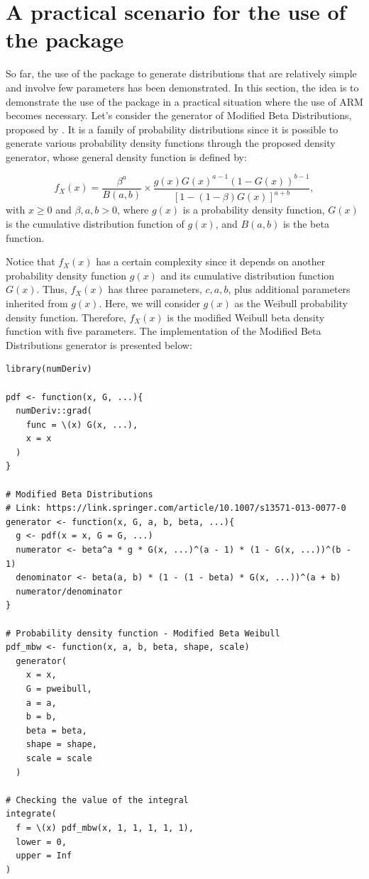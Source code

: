 \section{A practical scenario for the use of the package}\label{a-practical-scenario-for-the-use-of-the-package}

So far, the use of the package to generate distributions that are relatively simple and involve few parameters has been demonstrated. In this section, the idea is to demonstrate the use of the  package in a practical situation where the use of ARM becomes necessary. Let's consider the generator of Modified Beta Distributions, proposed by \citep{nadarajah2014modified}. It is a family of probability distributions since it is possible to generate various probability density functions through the proposed density generator, whose general density function is defined by:

\[f_X(x) = \frac{\beta^a}{B(a,b)} \times \frac{g(x)G(x)^{a - 1}(1 - G(x))^{b - 1}}{[1 - (1 - \beta)G(x)]^{a + b}},\] with \(x \geq 0\) and \(\beta, a, b > 0\), where \(g(x)\) is a probability density function, \(G(x)\) is the cumulative distribution function of \(g(x)\), and \(B(a,b)\) is the beta function.

Notice that \(f_{X}(x)\) has a certain complexity since it depends on another probability density function \(g(x)\) and its cumulative distribution function \(G(x)\). Thus, \(f_X(x)\) has three parameters, \(c, a, b\), plus additional parameters inherited from \(g(x)\). Here, we will consider \(g(x)\) as the Weibull probability density function. Therefore, \(f_X(x)\) is the modified Weibull beta density function with five parameters. The implementation of the Modified Beta Distributions generator is presented below:

\begin{verbatim}
library(numDeriv)

pdf <- function(x, G, ...){
  numDeriv::grad(
    func = \(x) G(x, ...),
    x = x
  )
}

# Modified Beta Distributions
# Link: https://link.springer.com/article/10.1007/s13571-013-0077-0
generator <- function(x, G, a, b, beta, ...){
  g <- pdf(x = x, G = G, ...)
  numerator <- beta^a * g * G(x, ...)^(a - 1) * (1 - G(x, ...))^(b - 1)
  denominator <- beta(a, b) * (1 - (1 - beta) * G(x, ...))^(a + b)
  numerator/denominator
}

# Probability density function - Modified Beta Weibull
pdf_mbw <- function(x, a, b, beta, shape, scale)
  generator(
    x = x,
    G = pweibull,
    a = a,
    b = b,
    beta = beta,
    shape = shape,
    scale = scale
  )

# Checking the value of the integral
integrate(
  f = \(x) pdf_mbw(x, 1, 1, 1, 1, 1),
  lower = 0,
  upper = Inf
)
\end{verbatim}

